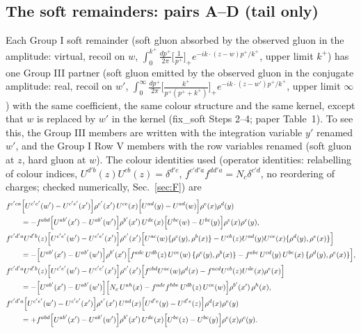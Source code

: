 \subsection{The soft remainders: pairs A--D (tail only)}\label{sec:C3}
Each Group I soft remainder (soft gluon absorbed by the observed gluon in the amplitude: virtual, recoil on $w$, $\int_{0}^{k^{+}}\frac{dp^{+}}{2\pi}\big[\frac{1}{p^{+}}\big]_{+}e^{-ik\cdot(z-w)p^{+}/k^{+}}$, upper limit $k^{+}$) has one Group III partner (soft gluon emitted by the observed gluon in the conjugate amplitude: real, recoil on $w'$, $\int_{0}^{\infty}\frac{dp^{+}}{2\pi}\big[\frac{k^{+}}{p^{+}(p^{+}+k^{+})}\big]_{+}e^{-ik\cdot(z-w')p^{+}/k^{+}}$, upper limit $\infty$) with the same coefficient, the same colour structure and the same kernel, except that $w$ is replaced by $w'$ in the kernel (fix\_soft Steps 2--4; paper Table~1). To see this, the Group III members are written with the integration variable $y'$ renamed $w'$, and the Group I Row V members with the row variables renamed (soft gluon at $z$, hard gluon at $w$). The colour identities used (operator identities: relabelling of colour indices, $U^{d'b}(z)U^{cb}(z)=\delta^{d'c}$, $f^{c'd'a}f^{dd'a}=N_{c}\delta^{c'd}$, no reordering of charges; checked numerically, Sec.~\ref{sec:F}) are
\begin{align}
&f^{c'ca}\Big[U^{c'e'}(w')-U^{c'e'}(x')\Big]\rho^{e'}(x')\,U^{ce}(x)\Big[U^{ad}(y)-U^{ad}(w)\Big]\rho^{e}(x)\rho^{d}(y)\notag\\
&\qquad=-f^{abd}\Big[U^{ab'}(x')-U^{ab'}(w')\Big]\rho^{b'}(x')\,U^{de}(x)\Big[U^{bc}(w)-U^{bc}(y)\Big]\rho^{e}(x)\rho^{c}(y),\notag\\
&f^{c'd'a}U^{d'b}(z)\Big[U^{c'e'}(w')-U^{c'e'}(x')\Big]\rho^{e'}(x')\Big[U^{ac}(w)\{\rho^{c}(y),\rho^{b}(x)\}-U^{cb}(z)U^{ad}(y)U^{ce}(x)\{\rho^{d}(y),\rho^{e}(x)\}\Big]\notag\\
&\qquad=-\Big[U^{ab'}(x')-U^{ab'}(w')\Big]\rho^{b'}(x')\Big[f^{adc}\,U^{db}(z)\,U^{ce}(w)\,\{\rho^{e}(y),\rho^{b}(x)\}-f^{abc}\,U^{cd}(y)\,U^{be}(x)\,\{\rho^{d}(y),\rho^{e}(x)\}\Big],\notag\\
&f^{c'd'a}U^{d'b}(z)\Big[U^{c'e'}(w')-U^{c'e'}(x')\Big]\rho^{e'}(x')\Big[f^{cbd}U^{ac}(w)\rho^{d}(x)-f^{acd}U^{cb}(z)U^{de}(x)\rho^{e}(x)\Big]\notag\\
&\qquad=-\Big[U^{ab'}(x')-U^{ab'}(w')\Big]\Big[N_{c}\,U^{ah}(x)-f^{adc}f^{hbe}\,U^{db}(z)\,U^{ce}(w)\Big]\rho^{b'}(x')\,\rho^{h}(x),\notag\\
&f^{c'd'a}\Big[U^{c'e'}(w')-U^{c'e'}(x')\Big]\rho^{e'}(x')\,U^{ad}(x)\Big[U^{d'e}(y)-U^{d'e}(z)\Big]\rho^{d}(x)\rho^{e}(y)\notag\\
&\qquad=+f^{abd}\Big[U^{ab'}(x')-U^{ab'}(w')\Big]\rho^{b'}(x')\,U^{de}(x)\Big[U^{bc}(z)-U^{bc}(y)\Big]\rho^{e}(x)\rho^{c}(y).\label{eq:C-colid}
\end{align}
